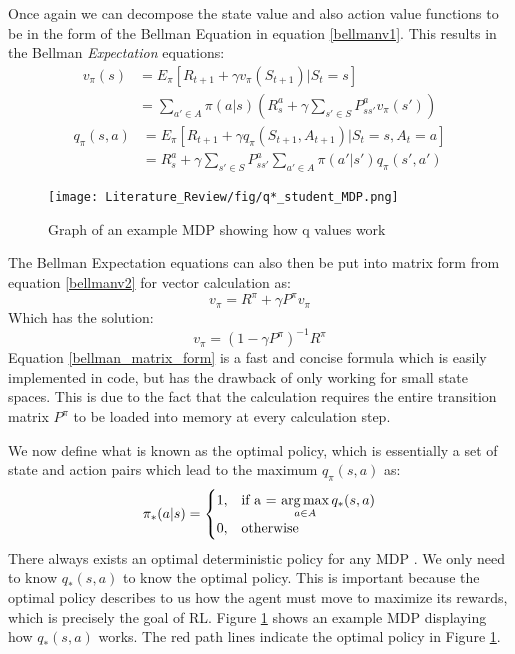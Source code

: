 Once again we can decompose the state value and also action value functions to be in the form of the Bellman Equation in equation \ref{bellmanv1}. This results in the Bellman \textit{Expectation} equations:
\begin{align}
	v_{\pi}(s)	&= E_{\pi}[R_{t+1} + \gamma v_{\pi}(S_{t+1})|S_t = s]\\
	&= \sum_{a'\in A}\pi(a|s)(R^{a}_s+\gamma\sum_{s'\in S}P^{a}_{ss'}v_\pi(s'))
	\label{bellmanv2}
\end{align}
\begin{align}
	q_{\pi}(s,a)	&= E_{\pi}[R_{t+1} + \gamma q_{\pi}(S_{t+1},A_{t+1})|S_t = s,A_t = a]\\
	&= R^{a}_s +\gamma \sum_{s'\in S}P^{a}_{ss'}\sum_{a'\in A}\pi(a'|s')q_\pi(s',a')
	\label{bellmanq}
\end{align}

\begin{figure}[!htb]
	\centering
	\texttt{[image: Literature\_Review/fig/q*\_student\_MDP.png]}
	\caption{Graph of an example MDP showing how q values work\cite{David_Silver}}
	\label{fig:q*}
	\centering
\end{figure}
The Bellman Expectation equations can also then be put into matrix form from equation \ref{bellmanv2} for vector calculation as:
\begin{equation}
	v_\pi = R^{\pi} + \gamma P^{\pi}v_\pi
\end{equation}
Which has the solution:
\begin{equation}
	v_\pi = (1 - \gamma P^{\pi})^{-1}R^{\pi}
	\label{bellman_matrix_form}
\end{equation}
Equation \ref{bellman_matrix_form} is a fast and concise formula which is easily implemented in code, but has the drawback of only working for small state spaces. This is due to the fact that the calculation requires the entire transition matrix $P^\pi$ to be loaded into memory at every calculation step.

We now define what is known as the optimal policy, which is essentially a set of state and action pairs which lead to the maximum $q_\pi(s,a)$ as:
\begin{align}
	\pi_{*}(a|s)=\begin{cases}
		1, & \text{if a = $\operatorname*{arg\,max}\limits_{a \in A}q_* (s,a)$}\\
		0, & \text{otherwise}
	\end{cases}
	\label{eq:pi_*}
\end{align}
There always exists an optimal deterministic policy for any MDP \cite{sutton_barto}. We only need to know $q_* (s,a)$ to know the optimal policy. This is important because the optimal policy describes to us how the agent must move to maximize its rewards, which is precisely the goal of RL. Figure \ref{fig:q*} shows an example MDP displaying how $q_* (s,a)$ works. The red path lines indicate the optimal policy in Figure \ref{fig:q*}.

